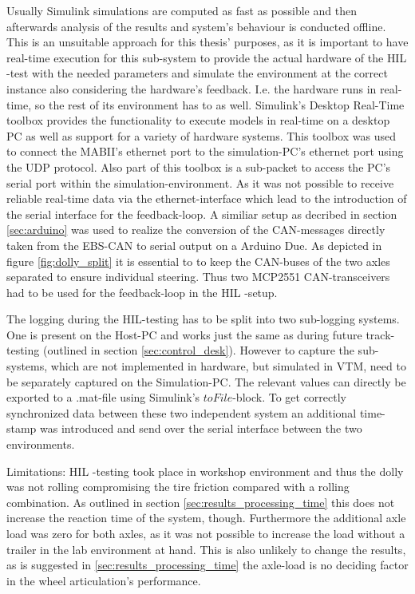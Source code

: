 \documentclass[ExampleMasters.tex]{subfiles}
\begin{document}
Usually Simulink simulations are computed as fast as possible and then afterwards analysis of the results and system's behaviour is conducted offline. This is an unsuitable approach for this thesis' purposes, as it is important to have real-time execution for this sub-system to provide the actual hardware of the \gls{HIL} -test with the needed parameters and simulate the environment at the correct instance also considering the hardware's feedback. I.e. the hardware runs in real-time, so the rest of its environment has to as well. Simulink's Desktop Real-Time toolbox provides the functionality to execute models in real-time on a desktop PC as well as support for a variety of hardware systems. This toolbox was used to connect the MABII's ethernet port to the simulation-PC's ethernet port using the \gls{UDP} protocol. Also part of this toolbox is a sub-packet to access the PC's serial port within the simulation-environment. As it was not possible to receive reliable real-time data via the ethernet-interface which lead to the introduction of the serial interface for the feedback-loop. A similiar setup as decribed in section \ref{sec:arduino} was used to realize the conversion of the CAN-messages directly taken from the \gls{EBS}-\gls{CAN} to serial output on a Arduino Due. As depicted in figure \ref{fig:dolly_split} it is essential to to keep the CAN-buses of the two axles separated to ensure individual steering. Thus two MCP2551 \gls{CAN}-transceivers had to be used for the feedback-loop in the \gls{HIL} -setup.

The logging during the \gls{HIL}-testing has to be split into two sub-logging systems. One is present on the Host-PC and works just the same as during future track-testing (outlined in section \ref{sec:control_desk}). However to capture the sub-systems, which are not implemented in hardware, but simulated in \gls{VTM}, need to be separately captured on the Simulation-PC. The relevant values can directly be exported to a .mat-file using Simulink's $toFile$-block. To get correctly synchronized data between these two independent system an additional time-stamp was introduced and send over the serial interface between the two environments. 

Limitations: \gls{HIL} -testing took place in workshop environment and thus the dolly was not rolling compromising the tire friction compared with a rolling combination. As outlined in section \ref{sec:results_processing_time} this does not increase the reaction time of the system, though. Furthermore the additional axle load was zero for both axles, as it was not possible to increase the load without a trailer in the lab environment at hand. This is also unlikely to change the results, as is suggested in \ref{sec:results_processing_time} the axle-load is no deciding factor in the wheel articulation's performance. 
\end{document}
